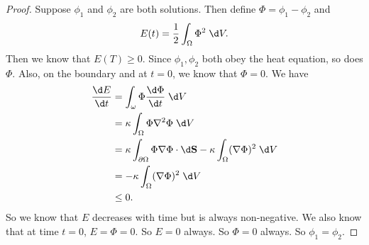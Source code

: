 \documentclass[a4paper]{article}
\begin{document}
\begin{proof}
  Suppose $\phi_1$ and $\phi_2$ are both solutions. Then define $\Phi = \phi_1 - \phi_2$ and
  \[
    E(t) = \frac{1}{2}\int_\Omega \Phi^2 \;\d V.
  \]
  Then we know that $E(T) \geq 0$. Since $\phi_1, \phi_2$ both obey the heat equation, so does $\Phi$. Also, on the boundary and at $t = 0$, we know that $\Phi = 0$. We have
  \begin{align*}
    \frac{\d E}{\d t} &= \int_\omega \Phi \frac{\d \Phi}{\d t}\;\d V\\
    &= \kappa \int_\Omega \Phi \nabla^2 \Phi\;\d V\\
    &= \kappa \int_{\partial \Omega} \Phi \nabla \Phi \cdot \d \mathbf{S} - \kappa \int_\Omega (\nabla \Phi)^2\;\d V\\
    &= - \kappa \int_\Omega (\nabla \Phi)^2\;\d V\\
    &\leq 0.
  \end{align*}
  So we know that $E$ decreases with time but is always non-negative. We also know that at time $t = 0$, $E = \Phi = 0$. So $E = 0$ always. So $\Phi = 0$ always. So $\phi_1 = \phi_2$.
\end{proof}
\end{document}
